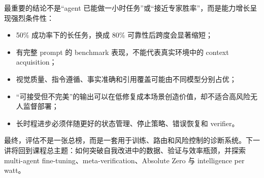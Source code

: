 \documentclass[a4paper]{article}
\begin{document}
最重要的结论不是“agent 已能做一小时任务”或“接近专家胜率”，而是能力增长呈现强烈条件性：

\begin{itemize}
    \item 50\% 成功率下的长任务，换成 80\% 可靠性后跨度会显著缩短；
    \item 有完整 prompt 的 benchmark 表现，不能代表真实环境中的 context acquisition；
    \item 视觉质量、指令遵循、事实准确和引用覆盖可能由不同模型分别占优；
    \item “可接受但不完美”的输出可以在低修复成本场景创造价值，却不适合高风险无人监督部署；
    \item 长时程进步必须伴随更好的状态管理、停止策略、错误恢复和 verifier。
\end{itemize}

最终，评估不是一张总榜，而是一套用于训练、路由和风险控制的诊断系统。下一讲将回到课程总主题：如何突破自我改进中的数据、验证与效率瓶颈，并探索 multi-agent fine-tuning、meta-verification、Absolute Zero 与 intelligence per watt。
\end{document}

